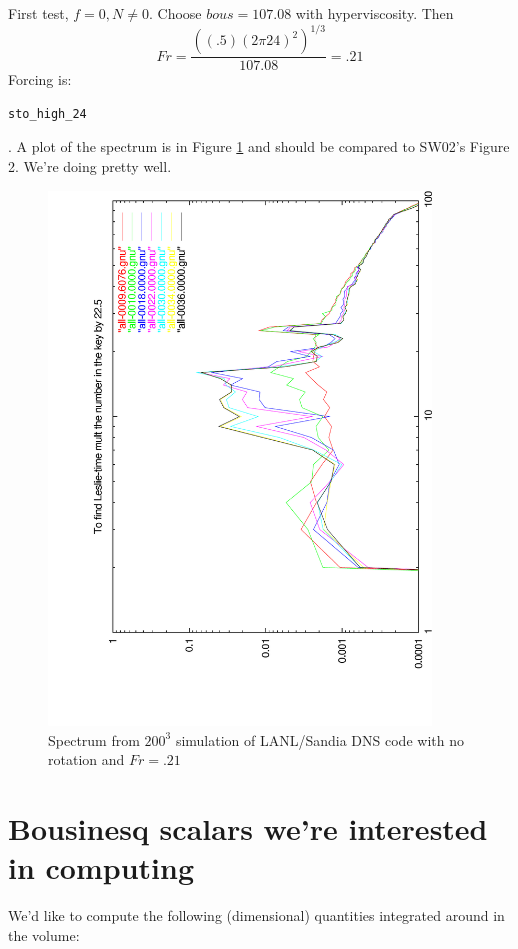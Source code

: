 \documentclass[12pt]{article}
\begin{document}
First test, $f=0, N\ne0$. Choose $bous=107.08$ with hyperviscosity. Then
\begin{equation}
Fr = \frac{\left((.5)(2 \pi 24)^{2}\right)^{1/3}}{107.08}= .21
\end{equation} 
Forcing is: 
\begin{verbatim}
sto_high_24
\end{verbatim}.
A plot of the spectrum is in Figure \ref{fig:norot} and should be
compared to SW02's Figure 2.  We're doing pretty well.
\begin{figure}
\begin{center}
\includegraphics[angle=-90,width=4in]{frp21}
\caption{Spectrum from $200^3$ simulation of LANL/Sandia DNS code with
  no rotation and $Fr=.21$ }
\label{fig:norot}
\end{center}
\end{figure}

\section{Bousinesq scalars we're interested in computing}

We'd like to compute the following (dimensional) quantities integrated
around in the volume:
\end{document}
